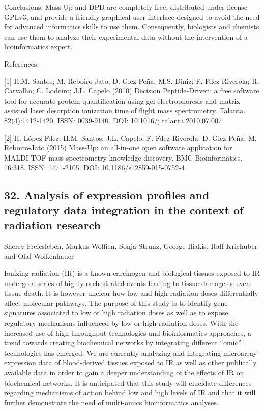 Conclusions: Mass-Up and DPD are completely free, distributed under license GPLv3, and provide a friendly graphical user interface designed to avoid the need for advanced informatics skills to use them. Consequently, biologists and chemists can use them to analyze their experimental data without the intervention of a bioinformatics expert.


References:

[1] H.M. Santos; M. Reboiro-Jato; D. Glez-Peña; M.S. Diniz; F. Fdez-Riverola; R. Carvalho; C. Lodeiro; J.L. Capelo (2010) Decision Peptide-Driven: a free software tool for accurate protein quantification using gel electrophoresis and matrix assisted laser desorption ionization time of flight mass spectrometry. Talanta. 82(4):1412-1420. ISSN: 0039-9140. DOI: 10.1016/j.talanta.2010.07.007

[2] H. López-Fdez; H.M. Santos; J.L. Capelo; F. Fdez-Riverola; D. Glez-Peña; M. Reboiro-Jato (2015) Mass-Up: an all-in-one open software application for MALDI-TOF mass spectrometry knowledge discovery. BMC Bioinformatics. 16:318. ISSN: 1471-2105. DOI: 10.1186/s12859-015-0752-4

\subsection*{\color{eubicRed} 32. Analysis of expression profiles and regulatory data integration in the context of radiation research}
{\color{eubicGray}Sherry Freiesleben, Markus Wolfien, Sonja Strunz, George Iliakis, Ralf Kriehuber and Olaf Wolkenhauer}

Ionizing radiation (IR) is a known carcinogen and biological tissues exposed to IR undergo a series of highly orchestrated events leading to tissue damage or even tissue death. It is however unclear how low and high radiation doses differentially affect molecular pathways. The purpose of this study is to identify gene signatures associated to low or high radiation doses as well as to expose regulatory mechanisms influenced by low or high radiation doses. With the increased use of high-throughput technologies and bioinformatics approaches, a trend towards creating biochemical networks by integrating different “omic” technologies has emerged. We are currently analyzing and integrating microarray expression data of blood-derived tissues exposed to IR as well as other publically available data in order to gain a deeper understanding of the effects of IR on biochemical networks. It is anticipated that this study will elucidate differences regarding mechanisms of action behind low and high levels of IR and that it will further demonstrate the need of multi-omics bioinformatics analyses.

